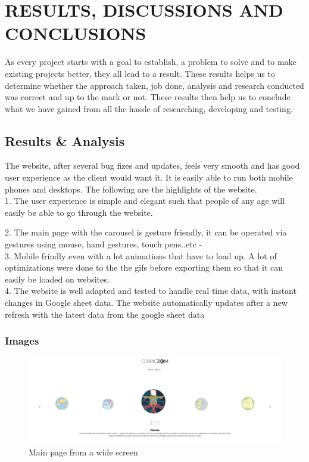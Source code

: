  \chapter{RESULTS, DISCUSSIONS AND CONCLUSIONS} %
\label{ChapterResults} %
As every project starts with a goal to establish, a problem to solve and to make existing
projects better, they all lead to a result. These results helps us to determine whether the
approach taken, job done, analysis and research conducted was correct and up to the
mark or not. These results then help us to conclude what we have gained from all the
hassle of researching, developing and testing.

\section{Results \& Analysis}
The website, after several bug fizes and updates, feels very smooth and has good user experience as the client would want it. It is easily able to run both mobile phones and desktops. The following are the highlights of the website.
\\
1. The user experience is simple and elegant such that people of any age will easily be able to go through the website. 


2. The main page with the carousel is gesture friendly, it can be operated via gestures using mouse, hand gestures, touch pens..etc   -
\\
3. Mobile frindly even with a lot animations that have to load up. A lot of optimizations were done to the the gifs before exporting them so that it can easily be loaded on websites.
\\
4. The website is well adapted and tested to handle real time data, with instant changes in Google sheet data. The website automatically updates after a new refresh with the latest data from the google sheet data

\subsection{Images}

\begin{figure}[h]
	\begin{center}
		\includegraphics[scale=0.2]{Figures/web-1.JPG}
		\caption{Main page from a wide screen}
		\label{fig:rb}
	\end{center}
\end{figure}

